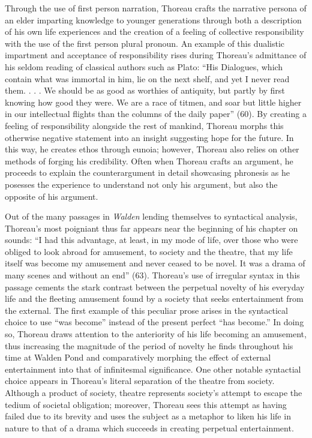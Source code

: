 \documentclass[12pt]{article}
\newcommand{\tq}[2]{
    \fancyhead[L]{\emph{Walden}: Reading Journals}
    \fancyhead[R]{TQ:\ #1 $\vert$ CH: #2}
}
\begin{document}
Through the use of first person narration, Thoreau crafts the narrative persona of an elder imparting knowledge to younger generations through both a description of his own life experiences and the creation of a feeling of collective responsibility with the use of the first person plural pronoun. An example of this dualistic impartment and acceptance of responsibility rises during Thoreau's admittance of his seldom reading of classical authors such as Plato: ``His Dialogues, which contain what was immortal in him, lie on the next shelf, and yet I never read them. . . . We should be as good as worthies of antiquity, but partly by first knowing how good they were. We are a race of titmen, and soar but little higher in our intellectual flights than the columns of the daily paper'' (60). By creating a feeling of responsibility alongside the rest of mankind, Thoreau morphs this otherwise negative statement into an insight suggesting hope for the future. In this way, he creates ethos through eunoia; however, Thoreau also relies on other methods of forging his credibility. Often when Thoreau crafts an argument, he proceeds to explain the counterargument in detail showcasing phronesis as he posesses the experience to understand not only his argument, but also the opposite of his argument.

\newpage
\tq{8}{4 - Sounds}


Out of the many passages in \emph{Walden} lending themselves to syntactical analysis, Thoreau's most poigniant thus far appears near the beginning of his chapter on sounds: ``I had this advantage, at least, in my mode of life, over those who were obliged to look abroad for amusement, to society and the theatre, that my life itself was become my amusement and never ceased to be novel. It was a drama of many scenes and without an end'' (63). Thoreau's use of irregular syntax in this passage cements the stark contrast between the perpetual novelty of his everyday life and the fleeting amusement found by a society that seeks entertainment from the external. The first example of this peculiar prose arises in the syntactical choice to use ``was become'' instead of the present perfect ``has become.'' In doing so, Thoreau draws attention to the anteriority of his life becoming an amusement, thus increasing the magnitude of the period of novelty he finds throughout his time at Walden Pond and comparatively morphing the effect of external entertainment into that of infinitesmal significance. One other notable syntactial choice appears in Thoreau's literal separation of the theatre from society. Although a product of society, theatre represents society's attempt to escape the tedium of societal obligation; moreover, Thoreau sees this attempt as having failed due to its brevity and uses the subject as a metaphor to liken his life in nature to that of a drama which succeeds in creating perpetual entertainment.
\end{document}
